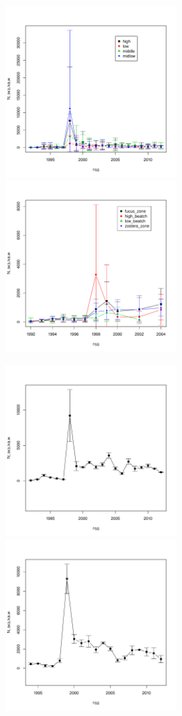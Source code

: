 \documentclass[12pt, a4paper]{article}
\begin{document}
\begin{figure}[h]

\begin{multicols}{2}
\hfill
\includegraphics[width=65mm]{../White_Sea/Luvenga_Goreliy/N_dynamic.pdf}
\hfill
\includegraphics[width=65mm]{../White_Sea//Luvenga_II_razrez/N_dynamic.pdf}
\end{multicols}



\begin{multicols}{2}
\hfill
\includegraphics[width=65mm]{../White_Sea/Estuatiy_Luvenga/N_dynamic.pdf}
\hfill
\includegraphics[width=65mm]{../White_Sea/Ryashkov_ZRS/N_dynamic.pdf}
\end{multicols}


\end{figure}
\end{document}

